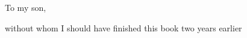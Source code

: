 
\thispagestyle{empty}

\begin{center}
To my son,

without whom I should have finished this book two years earlier
\end{center}

\setlength{\abovedisplayskip}{-5pt}
\setlength{\abovedisplayshortskip}{-5pt}
